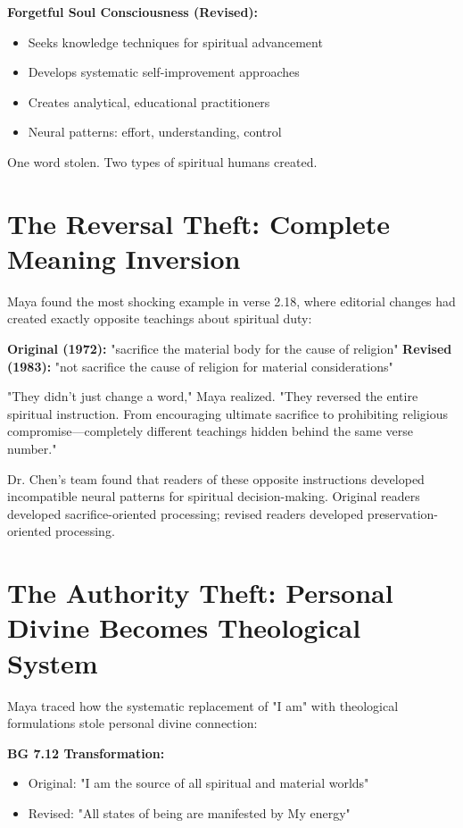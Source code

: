 \documentclass[11pt,twoside]{book}
\begin{document}
\textbf{\textbf{Forgetful Soul Consciousness (Revised):}}
\begin{itemize}
\item Seeks knowledge techniques for spiritual advancement
\item Develops systematic self-improvement approaches
\item Creates analytical, educational practitioners
\item Neural patterns: effort, understanding, control
\end{itemize}

One word stolen. Two types of spiritual humans created.
\section*{The Reversal Theft: Complete Meaning Inversion}
\label{sec:orgb9fd401}

Maya found the most shocking example in verse 2.18, where editorial changes had created exactly opposite teachings about spiritual duty:

\textbf{\textbf{Original (1972):}} "sacrifice the material body for the cause of religion"
\textbf{\textbf{Revised (1983):}} "not sacrifice the cause of religion for material considerations"

"They didn't just change a word," Maya realized. "They reversed the entire spiritual instruction. From encouraging ultimate sacrifice to prohibiting religious compromise—completely different teachings hidden behind the same verse number."

Dr. Chen's team found that readers of these opposite instructions developed incompatible neural patterns for spiritual decision-making. Original readers developed sacrifice-oriented processing; revised readers developed preservation-oriented processing.
\section*{The Authority Theft: Personal Divine Becomes Theological System}
\label{sec:orgc869914}

Maya traced how the systematic replacement of "I am" with theological formulations stole personal divine connection:

\textbf{\textbf{BG 7.12 Transformation:}}
\begin{itemize}
\item Original: "I am the source of all spiritual and material worlds"
\item Revised: "All states of being are manifested by My energy"
\end{itemize}
\end{document}
